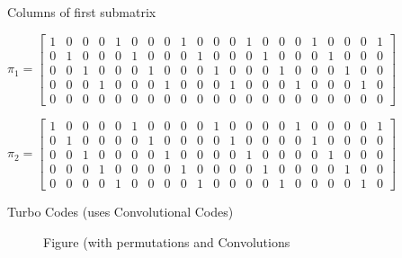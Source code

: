 \documentclass[11pt]{article}
\begin{document}
Columns of first submatrix

\(\pi_1 = \begin{bmatrix}
1 & 0 & 0 & 0 & 1 & 0 & 0 & 0 & 1 & 0 & 0 & 0 & 1 & 0 & 0 & 0 & 1 & 0 & 0 & 0 & 1 \\
0 & 1 & 0 & 0 & 0 & 1 & 0 & 0 & 0 & 1 & 0 & 0 & 0 & 1 & 0 & 0 & 0 & 1 & 0 & 0 & 0 \\
0 & 0 & 1 & 0 & 0 & 0 & 1 & 0 & 0 & 0 & 1 & 0 & 0 & 0 & 1 & 0 & 0 & 0 & 1 & 0 & 0 \\
0 & 0 & 0 & 1 & 0 & 0 & 0 & 1 & 0 & 0 & 0 & 1 & 0 & 0 & 0 & 1 & 0 & 0 & 0 & 1 & 0 \\
0 & 0 & 0 & 0 & 0 & 0 & 0 & 0 & 0 & 0 & 0 & 0 & 0 & 0 & 0 & 0 & 0 & 0 & 0 & 0 & 0
\end{bmatrix}\)

\(\pi_2 = \begin{bmatrix}
1 & 0 & 0 & 0 & 0 & 1 & 0 & 0 & 0 & 0 & 1 & 0 & 0 & 0 & 0 & 1 & 0 & 0 & 0 & 0 & 1 \\
0 & 1 & 0 & 0 & 0 & 0 & 1 & 0 & 0 & 0 & 0 & 1 & 0 & 0 & 0 & 0 & 1 & 0 & 0 & 0 & 0 \\
0 & 0 & 1 & 0 & 0 & 0 & 0 & 1 & 0 & 0 & 0 & 0 & 1 & 0 & 0 & 0 & 0 & 1 & 0 & 0 & 0 \\
0 & 0 & 0 & 1 & 0 & 0 & 0 & 0 & 1 & 0 & 0 & 0 & 0 & 1 & 0 & 0 & 0 & 0 & 1 & 0 & 0 \\
0 & 0 & 0 & 0 & 1 & 0 & 0 & 0 & 0 & 1 & 0 & 0 & 0 & 0 & 1 & 0 & 0 & 0 & 0 & 1 & 0
\end{bmatrix}\)

    Turbo Codes (uses Convolutional Codes)

\begin{figure}
\centering
{}
\caption{Figure (with permutations and Convolutions}
\end{figure}
\end{document}
